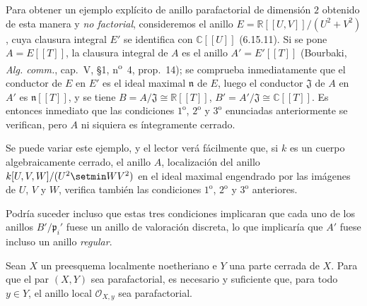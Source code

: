 \begin{env}[21.13.9]
Para obtener un ejemplo explícito de anillo parafactorial de dimensión $2$ obtenido de
esta manera y \emph{no factorial}, consideremos el anillo
$E=\mathbb R[[U,V]]/(U^2+V^2)$,
cuya clausura integral $E'$ se identifica con $\mathbb C[[U]]$ (6.15.11). Si se pone
$A=E[[T]]$, la clausura integral de $A$ es el anillo $A'=E'[[T]]$ (Bourbaki,
\emph{Alg. comm.}, cap.~V, \S1, n\textsuperscript{o}~4, prop.~14); se comprueba
inmediatamente que el conductor de $E$ en $E'$ es el ideal maximal $\mathfrak n$ de
$E$, luego el conductor $\mathfrak J$ de $A$ en $A'$ es $\mathfrak n[[T]]$, y se
tiene $B=A/\mathfrak J\cong\mathbb R[[T]]$, $B'=A'/\mathfrak J\cong\mathbb C[[T]]$.
Es entonces inmediato que las condiciones $1^{\mathrm o}$, $2^{\mathrm o}$ y
$3^{\mathrm o}$ enunciadas anteriormente se verifican, pero $A$ ni siquiera es
íntegramente cerrado.

Se puede variar este ejemplo, y el lector verá fácilmente que, si $k$ es un cuerpo
algebraicamente cerrado, el anillo $A$, localización del anillo
$k[U,V,W]/(U^2\setmin WV^2)$ en el ideal maximal engendrado por las imágenes de $U$, $V$ y $W$,
verifica también las condiciones $1^{\mathrm o}$, $2^{\mathrm o}$ y $3^{\mathrm o}$
anteriores.

Podría suceder incluso que estas tres condiciones implicaran que cada uno de los anillos
$B'/\mathfrak p_i'$ fuese un anillo de valoración discreta, lo que implicaría que
$A'$ fuese incluso un anillo \emph{regular}.
\end{env}

\begin{proposition}[21.13.10]
\label{IV.21.13.10}
Sean $X$ un preesquema localmente noetheriano e $Y$ una parte cerrada de $X$. Para que
el par $(X,Y)$ sea parafactorial, es necesario y suficiente que, para todo $y\in Y$,
el anillo local $\mathcal O_{X,y}$ sea parafactorial.
\end{proposition}

